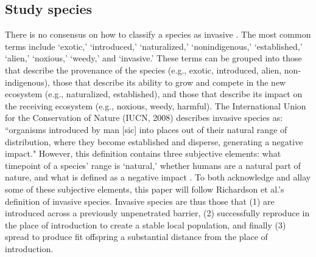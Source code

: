 \documentclass[12pt]{article}\usepackage[]{graphicx}\usepackage[]{color}
\begin{document}
	\subsection{Study species}
	There is no consensus on how to classify a species as invasive \parencite{Colautti2004}. The most common terms include `exotic,' `introduced,' `naturalized,' `nonindigenous,' `established,' `alien,' `noxious,' `weedy,' and `invasive.' These terms can be grouped into those that describe the provenance of the species (e.g., exotic, introduced, alien, non-indigenous), those that describe its ability to grow and compete in the new ecosystem (e.g., naturalized, established), and those that describe its impact on the receiving ecosystem (e.g., noxious, weedy, harmful). The International Union for the Conservation of Nature (IUCN, 2008) describes invasive species as: ``organisms introduced by man [sic] into places out of their natural range of distribution, where they become established and disperse, generating a negative impact." \nocite{IUCN2008is} However, this definition contains three subjective elements: what timepoint of a species' range is `natural,' whether humans are a natural part of nature, and what is defined as a negative impact \parencite{Munro2019}. To both acknowledge and allay some of these subjective elements, this paper will follow Richardson et al.'s \parencite{Richardson2000,Richardson2011} definition of invasive species. Invasive species are thus those that (1) are introduced across a previously unpenetrated barrier, (2) successfully reproduce in the place of introduction to create a stable local population, and finally (3) spread to produce fit offspring a substantial distance from the place of introduction.
	
\end{document}

